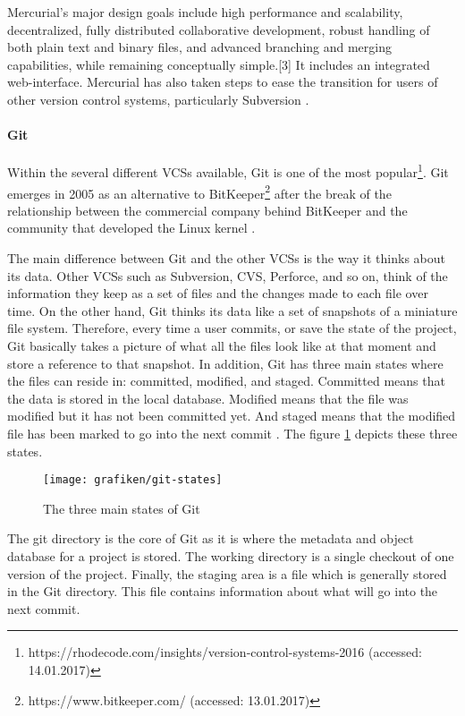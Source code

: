 Mercurial's major design goals include high performance and scalability, decentralized, fully distributed collaborative development, robust handling of both plain text and binary files, and advanced branching and merging capabilities, while remaining conceptually simple.[3] It includes an integrated web-interface. Mercurial has also taken steps to ease the transition for users of other version control systems, particularly Subversion \cite{Mackall2006}.
\paragraph{Git}
Within the several different VCSs available, Git is one of the most popular\footnote{https://rhodecode.com/insights/version-control-systems-2016 (accessed: 14.01.2017)}. Git emerges in 2005 as an alternative to BitKeeper\footnote{https://www.bitkeeper.com/ (accessed: 13.01.2017)} after the break of the relationship between the commercial company behind BitKeeper and  the community that developed the Linux kernel \cite{Chacon2009}.

The main difference between Git and the other VCSs is the way it thinks about its data. Other VCSs such as Subversion, CVS, Perforce, and so on, think of the information they keep as a set of files and the changes made to each file over time. On the other hand, Git thinks its data like a set of snapshots of a miniature file system. Therefore, every time a user commits, or save the state of the project, Git basically takes a picture of what all the files look like at that moment and store a reference to that snapshot. In addition, Git has three main states where the files can reside in: committed, modified, and staged. Committed means that the data is stored in the local database. Modified means that the file was modified but it has not been committed yet. And staged means that the modified file has been marked to go into the next commit \cite{Chacon2009}. The figure \ref{fig:git-sates} depicts these three states.

\begin{figure}[ht]
	\centering
    \texttt{[image: grafiken/git-states]}
    \caption{The three main states of Git \cite{Chacon2009}}
    \label{fig:git-sates}
\end{figure}

The git directory is the core of Git as it is where the metadata and object database for a project is stored. The working directory is a single checkout of one version of the project. Finally, the staging area is a file which is generally stored in the Git directory. This file contains information about what will go into the next commit.

